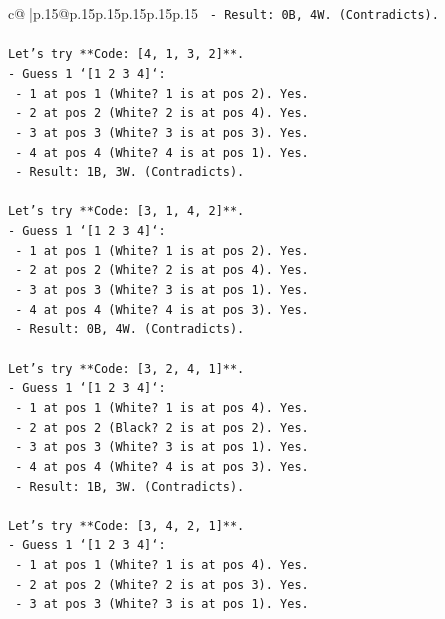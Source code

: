 \documentclass{article}
\begin{document}
{\begin{supertabular}{c@{$\;$}|p{.15\linewidth}@{}p{.15\linewidth}p{.15\linewidth}p{.15\linewidth}p{.15\linewidth}p{.15\linewidth}}
{{{\texttt{  {-} Result: 0B, 4W. (Contradicts).} \\
\\ 
\texttt{Let's try **Code: {[}4, 1, 3, 2{]}**.} \\
\texttt{{-} Guess 1 `{[}1 2 3 4{]}`:} \\
\texttt{  {-} 1 at pos 1 (White? 1 is at pos 2). Yes.} \\
\texttt{  {-} 2 at pos 2 (White? 2 is at pos 4). Yes.} \\
\texttt{  {-} 3 at pos 3 (White? 3 is at pos 3). Yes.} \\
\texttt{  {-} 4 at pos 4 (White? 4 is at pos 1). Yes.} \\
\texttt{  {-} Result: 1B, 3W. (Contradicts).} \\
\\ 
\texttt{Let's try **Code: {[}3, 1, 4, 2{]}**.} \\
\texttt{{-} Guess 1 `{[}1 2 3 4{]}`:} \\
\texttt{  {-} 1 at pos 1 (White? 1 is at pos 2). Yes.} \\
\texttt{  {-} 2 at pos 2 (White? 2 is at pos 4). Yes.} \\
\texttt{  {-} 3 at pos 3 (White? 3 is at pos 1). Yes.} \\
\texttt{  {-} 4 at pos 4 (White? 4 is at pos 3). Yes.} \\
\texttt{  {-} Result: 0B, 4W. (Contradicts).} \\
\\ 
\texttt{Let's try **Code: {[}3, 2, 4, 1{]}**.} \\
\texttt{{-} Guess 1 `{[}1 2 3 4{]}`:} \\
\texttt{  {-} 1 at pos 1 (White? 1 is at pos 4). Yes.} \\
\texttt{  {-} 2 at pos 2 (Black? 2 is at pos 2). Yes.} \\
\texttt{  {-} 3 at pos 3 (White? 3 is at pos 1). Yes.} \\
\texttt{  {-} 4 at pos 4 (White? 4 is at pos 3). Yes.} \\
\texttt{  {-} Result: 1B, 3W. (Contradicts).} \\
\\ 
\texttt{Let's try **Code: {[}3, 4, 2, 1{]}**.} \\
\texttt{{-} Guess 1 `{[}1 2 3 4{]}`:} \\
\texttt{  {-} 1 at pos 1 (White? 1 is at pos 4). Yes.} \\
\texttt{  {-} 2 at pos 2 (White? 2 is at pos 3). Yes.} \\
\texttt{  {-} 3 at pos 3 (White? 3 is at pos 1). Yes.} \\
}}}
\end{supertabular}}
\end{document}
